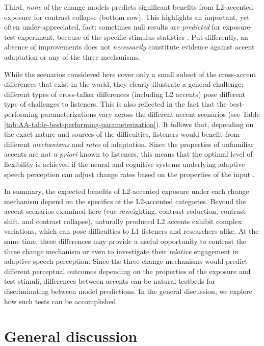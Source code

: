 \documentclass[
  11pt,
  man,floatsintext]{apa6}
\begin{document}
Third, \emph{none} of the change models predicts significant benefits from L2-accented exposure for contrast collapse (bottom row). This highlights an important, yet often under-appreciated, fact: sometimes null results are \emph{predicted} for exposure-test experiment, because of the specific stimulus statistics \autocites[see][]{tan2021,zheng-samuel2020}. Put differently, an absence of improvements does not \emph{necessarily} constitute evidence against accent adaptation or any of the three mechanisms.

While the scenarios considered here cover only a small subset of the cross-accent differences that exist in the world, they clearly illustrate a general challenge: different types of cross-talker differences (including L2 accents) pose different type of challenges to listeners. This is also reflected in the fact that the best-performing parameterizations vary across the different accent scenarios (see Table \ref{tab:AA-table-best-performing-parameterization}). It follows that, depending on the exact nature and sources of the difficulties, listeners would benefit from different \emph{mechanisms} and \emph{rates} of adaptation. Since the properties of unfamiliar accents are not \emph{a priori} known to listeners, this means that the optimal level of flexibility is achieved if the neural and cognitive systems underlying adaptive speech perception can adjust change rates based on the properties of the input \autocite[see discussion of the trade-off between flexibility and stability in][pp.~180-182]{kleinschmidt-jaeger2015}.

In summary, the expected benefits of L2-accented exposure under each change mechanism depend on the specifics of the L2-accented categories. Beyond the accent scenarios examined here (cue-reweighting, contrast reduction, contrast shift, and contrast collapse), naturally produced L2 accents exhibit complex variations, which can pose difficulties to L1-listeners and researchers alike. At the same time, these differences may provide a useful opportunity to contrast the three change mechanism or even to investigate their \emph{relative} engagement in adaptive speech perception. Since the three change mechanisms would predict different perceptual outcomes depending on the properties of the exposure and test stimuli, differences between accents can be natural testbeds for discriminating between model predictions. In the general discussion, we explore how such tests can be accomplished.

\hypertarget{sec:general-discussion}{%
\section{General discussion}\label{sec:general-discussion}}
\end{document}
